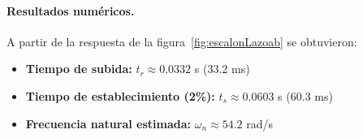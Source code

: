 \paragraph{Resultados numéricos.}  
A partir de la respuesta de la figura~\ref{fig:escalonLazoab} se obtuvieron:
\begin{itemize}
	\item \textbf{Tiempo de subida:} $t_r \approx 0.0332$ s (33.2 ms)
	\item \textbf{Tiempo de establecimiento (2\%):} $t_s \approx 0.0603$ s (60.3 ms)
	\item \textbf{Frecuencia natural estimada:} $\omega_n \approx 54.2$ rad/s
\end{itemize}





